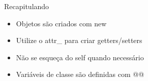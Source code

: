 \begin{frame}[fragile,t]{Recapitulando}
  \begin{itemize}
    \item Objetos são criados com \alert{new}
    \item Utilize o \alert{attr\_} para criar getters/setters
    \item Não se esqueça do \alert{self} quando necessário
    \item Variáveis de classe são definidas com \alert{@@}
  \end{itemize}
\end{frame}



